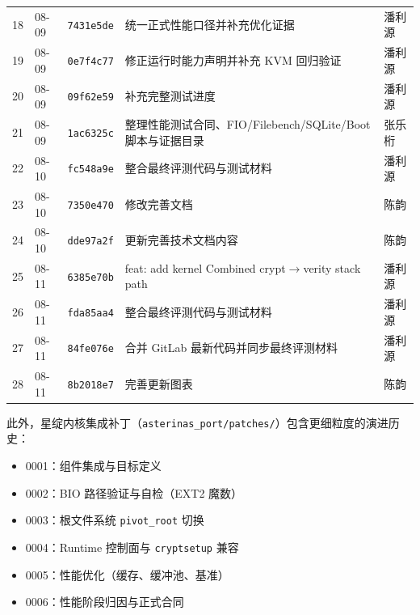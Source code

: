 \begin{table}[H]
\begin{tabular}{p{}p{}p{}p{}p{}}
        18 & 08-09 & \texttt{7431e5de} & 统一正式性能口径并补充优化证据 & 潘利源 \\
        19 & 08-09 & \texttt{0e7f4c77} & 修正运行时能力声明并补充 KVM 回归验证 & 潘利源 \\
        20 & 08-09 & \texttt{09f62e59} & 补充完整测试进度 & 潘利源 \\
        21 & 08-09 & \texttt{1ac6325c} & 整理性能测试合同、FIO/Filebench/SQLite/Boot 脚本与证据目录 & 张乐桁 \\
        22 & 08-10 & \texttt{fc548a9e} & 整合最终评测代码与测试材料 & 潘利源 \\
        23 & 08-10 & \texttt{7350e470} & 修改完善文档 & 陈韵 \\
        24 & 08-10 & \texttt{dde97a2f} & 更新完善技术文档内容 & 陈韵 \\
        25 & 08-11 & \texttt{6385e70b} & feat: add kernel Combined crypt\allowbreak $\to$\allowbreak verity stack path & 潘利源 \\
        26 & 08-11 & \texttt{fda85aa4} & 整合最终评测代码与测试材料 & 潘利源 \\
        27 & 08-11 & \texttt{84fe076e} & 合并 GitLab 最新代码并同步最终评测材料 & 潘利源 \\
        28 & 08-11 & \texttt{8b2018e7} & 完善更新图表 & 陈韵 \\
        \bottomrule
    \end{tabular}
\end{table}

此外，星绽内核集成补丁（\texttt{asterinas\_\allowbreak port/\allowbreak patches/}）包含更细粒度的演进历史：
\begin{itemize}
    \item 0001：组件集成与目标定义
    \item 0002：BIO 路径验证与自检（EXT2 魔数）
    \item 0003：根文件系统 \texttt{pivot\_root} 切换
    \item 0004：Runtime 控制面与 \texttt{cryptsetup} 兼容
    \item 0005：性能优化（缓存、缓冲池、基准）
    \item 0006：性能阶段归因与正式合同
\end{itemize}

